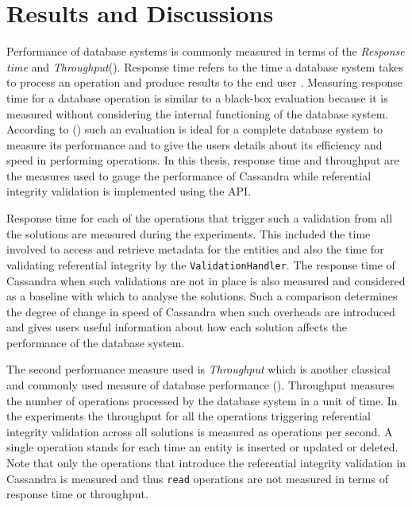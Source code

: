 \chapter{Results and Discussions}

Performance of database systems is commonly measured in terms of the
\textit{Response time} and \textit{Throughput}().
Response time refers to the time  a database system takes to process an
operation and produce results to the end user . Measuring response time for a
database operation is similar to a black-box evaluation because it is measured 
without considering the internal functioning  of the database system. According
to () such an evaluation is ideal for a complete database
system to measure its performance and to give the users details about its 
efficiency and speed in performing operations. In this thesis, response time and
throughput are the measures used to gauge the performance of Cassandra
while referential integrity validation is implemented using the \ac{API}.

Response time for each of the  operations that trigger such a validation from
all the solutions are measured during the experiments. This included the
time involved to access and retrieve metadata for the entities and also the time for
validating referential integrity by the \texttt{ValidationHandler}. The response
time of Cassandra when such validations are not in place is also measured and considered as a
baseline with which to analyse the solutions. Such a comparison  determines the degree of
change in speed of Cassandra when such overheads are introduced and gives 
users useful information about how each solution affects the performance of
the database system.

The second performance measure used is \textit{Throughput} which
is another classical and commonly used measure of database performance
().
Throughput measures the number of operations processed by the database system in a unit of
time. In the experiments the throughput for all the operations
triggering referential integrity validation across all solutions is measured
as operations per second.
A single operation stands for each time an entity is inserted or updated or
deleted. 
Note that only the operations that
introduce the referential integrity validation in Cassandra is measured and thus
\texttt{read} operations are not measured in terms of response time or
throughput.


